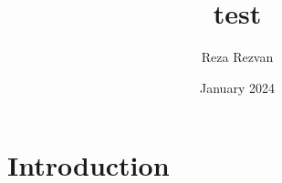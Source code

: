 \documentclass{article}
\title{test}
\author{Reza Rezvan}
\date{January 2024}
\begin{document}
\maketitle

\section{Introduction}
\end{document}
